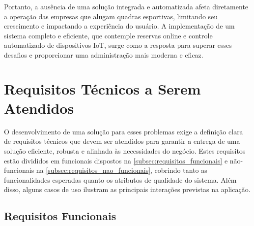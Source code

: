 Portanto, a ausência de uma solução integrada e automatizada afeta diretamente a operação das empresas que alugam quadras esportivas, limitando seu crescimento e impactando a experiência do usuário. A implementação de um sistema completo e eficiente, que contemple reservas online e controle automatizado de dispositivos IoT, surge como a resposta para superar esses desafios e proporcionar uma administração mais moderna e eficaz.


\section{Requisitos Técnicos a Serem Atendidos}

O desenvolvimento de uma solução para esses problemas exige a definição clara de requisitos técnicos que devem ser atendidos para garantir a entrega de uma solução eficiente, robusta e alinhada às necessidades do negócio. Estes requisitos estão divididos em funcionais dispostos na \autoref{subsec:requisitos_funcionais} e não-funcionais na \autoref{subsec:requisitos_nao_funcionais}, cobrindo tanto as funcionalidades esperadas quanto os atributos de qualidade do sistema. Além disso, alguns casos de uso ilustram as principais interações previstas na aplicação.

\subsection{Requisitos Funcionais}\label{subsec:requisitos_funcionais}

